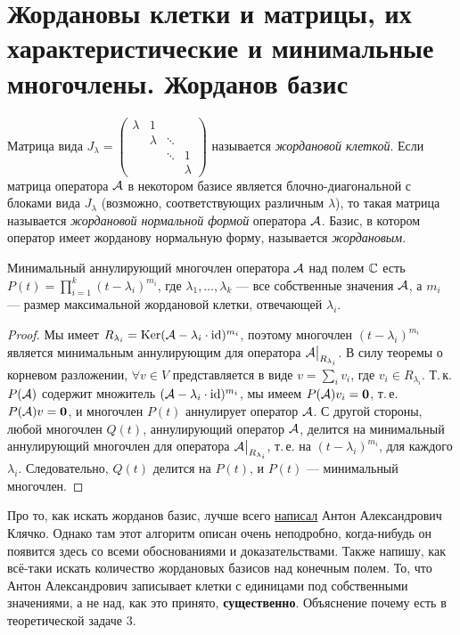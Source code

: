 \section{Жордановы клетки и матрицы, их характеристические и минимальные многочлены. Жорданов базис}

\begin{definition}
    Матрица вида
    $
    J_\lambda =
    \begin{pmatrix}
        \lambda & 1 & & \\
         & \lambda & \ddots & \\
         & & \ddots & 1 \\
         & & & \lambda
    \end{pmatrix}
    $ называется \textit{жордановой клеткой}. Если матрица оператора $\mathcal{A}$ в некотором базисе является блочно-диагональной с блоками вида $J_\lambda$ (возможно, соответствующих различным $\lambda$), то такая матрица называется \textit{жордановой нормальной формой} оператора $\mathcal{A}$. Базис, в котором оператор имеет жорданову нормальную форму, называется \textit{жордановым}.
\end{definition}

\begin{proposal}
    Минимальный аннулирующий многочлен оператора $\mathcal{A}$ над полем $\mathbb{C}$ есть $P(t) = \prod\limits_{i = 1}^k(t - \lambda_i)^{m_i}$, где $\lambda_1, \ldots, \lambda_k$ --- все собственные значения $\mathcal{A}$, а $m_i$ --- размер максимальной жордановой клетки, отвечающей $\lambda_i$.
\end{proposal}

\begin{proof}
    Мы имеет $R_{\lambda_i} = \operatorname{Ker}(\mathcal{A} - \lambda_i \cdot \mathrm{id})^{m_i}$, поэтому многочлен $(t - \lambda_i)^{m_i}$ является минимальным аннулирующим для оператора $\mathcal{A}\big|_{R_{\lambda_i}}$. В силу теоремы о корневом разложении, $\forall v \in V$ представляется в виде $v = \sum\limits_iv_i$, где $v_i \in R_{\lambda_i}$. Т.\,к. $P(\mathcal{A})$ содержит множитель $(\mathcal{A} - \lambda_i \cdot \mathrm{id})^{m_i}$, мы имеем $P(\mathcal{A})v_i = \boldsymbol{0}$, т.\,е. $P(\mathcal{A})v = \boldsymbol{0}$, и многочлен $P(t)$ аннулирует оператор $\mathcal{A}$. С другой стороны, любой многочлен $Q(t)$, аннулирующий оператор $\mathcal{A}$, делится на минимальный аннулирующий многочлен для оператора $\mathcal{A}\big|_{R_{\lambda_i}}$, т.\,е. на $(t - \lambda_i)^{m_i}$, для каждого $\lambda_i$. Следовательно, $Q(t)$ делится на $P(t)$, и $P(t)$ --- минимальный многочлен.
\end{proof}

Про то, как искать жорданов базис, лучше всего \href{http://halgebra.math.msu.su/staff/klyachko/teaching/lin.al/JB1.PDF}{написал} Антон Александрович Клячко. Однако там этот алгоритм описан очень неподробно, когда-нибудь он появится здесь со всеми обоснованиями и доказательствами. Также напишу, как всё-таки искать количество жордановых базисов над конечным полем. То, что Антон Александрович записывает клетки с единицами под собственными значениями, а не над, как это принято, \textbf{существенно}. Объяснение почему есть в теоретической задаче 3.

